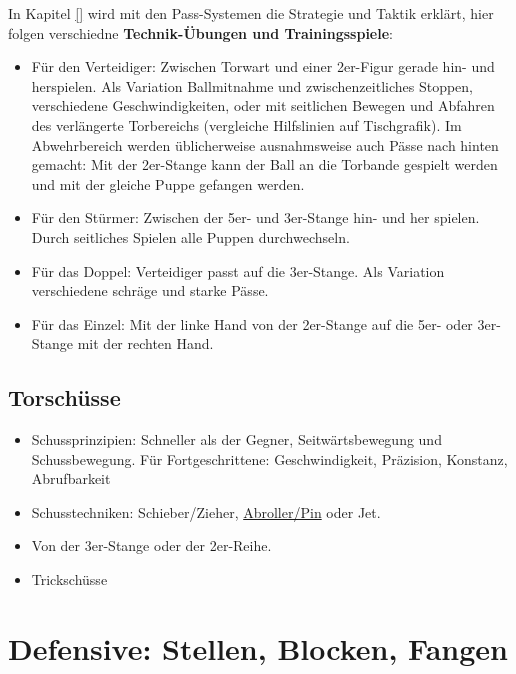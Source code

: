 In Kapitel \ref{} wird mit den Pass-Systemen die Strategie und Taktik erklärt, hier folgen verschiedne \textbf{Technik-Übungen und Trainingsspiele}: 
\begin{itemize}
    \item Für den Verteidiger: Zwischen Torwart und einer 2er-Figur gerade hin- und herspielen. Als Variation Ballmitnahme und zwischenzeitliches Stoppen, verschiedene Geschwindigkeiten, oder mit seitlichen Bewegen und Abfahren des verlängerte Torbereichs (vergleiche Hilfslinien auf Tischgrafik).  
Im Abwehrbereich werden üblicherweise ausnahmsweise auch Pässe nach hinten gemacht: Mit der 2er-Stange kann der Ball an die Torbande gespielt werden und mit der gleiche Puppe gefangen werden.
    \item Für den Stürmer: Zwischen der 5er- und 3er-Stange hin- und her spielen. Durch seitliches Spielen alle Puppen durchwechseln.
    \item Für das Doppel: Verteidiger passt auf die 3er-Stange. Als Variation verschiedene schräge und starke Pässe.  
    \item Für das Einzel: Mit der linke Hand von der 2er-Stange auf die 5er- oder 3er-Stange mit der rechten Hand.
\end{itemize}




\subsection{Torschüsse}
\label{technik:offensive:torschuesse}

\begin{itemize}
\item Schussprinzipien: Schneller als der Gegner, Seitwärtsbewegung und Schussbewegung. Für Fortgeschrittene: Geschwindigkeit, Präzision, Konstanz, Abrufbarkeit
\item Schusstechniken: Schieber/Zieher, \href{http://ungeblogtkickern.blogspot.de/2014/07/schritt-fur-schritt-pin-schieen.html}{Abroller/Pin} oder Jet.
\item Von der 3er-Stange oder der 2er-Reihe.
\item Trickschüsse
\end{itemize}





\section{Defensive: Stellen, Blocken, Fangen}
\label{technik:defensive}

